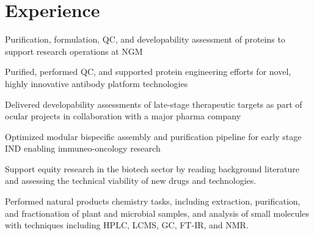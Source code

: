 \documentclass[]{deedy-resume-openfont}
\begin{document}
\begin{minipage}[t]{0.66\textwidth} 


\section{Experience}
\vspace{\topsep} %
\begin{tightemize}
\item Purification, formulation, QC, and developability assessment of proteins to support research operations at NGM
\item Purified, performed QC, and supported protein engineering efforts for novel, highly innovative antibody platform technologies
\item Delivered developability assessments of late-stage therapeutic targets as part of ocular projects in collaboration with a major pharma company
\item Optimized modular bispecific assembly and purification pipeline for early stage IND enabling immuneo-oncology research 
\end{tightemize}
\sectionsep

\begin{tightemize}
\item Support equity research in the biotech sector by reading background literature and assessing the technical viability of new drugs and technologies.
\end{tightemize}
\sectionsep

\begin{tightemize}
\item Performed natural products chemistry tasks, including extraction, purification, and fractionation of plant and microbial samples, and analysis of small molecules with techniques including HPLC, LCMS, GC, FT-IR, and NMR.
\end{tightemize}


\end{minipage}
\end{document}
